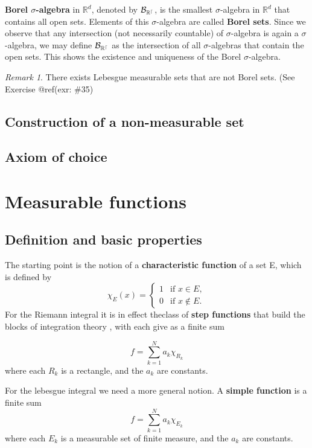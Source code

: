 \documentclass[
]{book}
\theoremstyle{definition}
\theoremstyle{definition}
\theoremstyle{definition}
\theoremstyle{definition}
\theoremstyle{remark}
\newtheorem*{remark}{Remark}
\begin{document}
\textbf{Borel \(\sigma\)-algebra} in \(\mathbb{R}^d\), denoted by \(\cal B_{\mathbb{R}^d}\), is the smallest \(\sigma\)-algebra in \(\mathbb{R}^d\) that contains all open sets. Elements of this \(\sigma\)-algebra are called \textbf{Borel sets}. Since we observe that any intersection (not necessarily countable) of \(\sigma\)-algebra is again a \(\sigma\)-algebra, we may define \(\cal B_{\mathbb{R}^d}\) as the intersection of all \(\sigma\)-algebras that contain the open sets. This shows the existence and uniqueness of the Borel \(\sigma\)-algebra.

\begin{remark}
There exists Lebesgue measurable sets that are not Borel sets. (See Exercise @ref(exr: \#35)
\end{remark}

\subsection{Construction of a non-measurable set}\label{construction-of-a-non-measurable-set}

\subsection{Axiom of choice}\label{axiom-of-choice}

\section{Measurable functions}\label{measurable-functions}

\subsection{Definition and basic properties}\label{definition-and-basic-properties}

The starting point is the notion of a \textbf{characteristic function} of a set E, which is defined by
\[
\chi_E(x)=
\begin{cases}
1& \text{if }x\in E,\\
0& \text{if }x\not\in E.
\end{cases}
\]
For the Riemann integral it is in effect theclass of \textbf{step functions} that build the blocks of integration theory , with each give as a finite sum

\[
f = \sum_{k=1}^Na_k\chi_{R_k}
\]
where each \(R_k\) is a rectangle, and the \(a_k\) are constants.

For the lebesgue integral we need a more general notion. A \textbf{simple function} is a finite sum
\[
f = \sum_{k=1}^Na_k\chi_{E_k}
\]
where each \(E_k\) is a measurable set of finite measure, and the \(a_k\) are constants.
\end{document}
